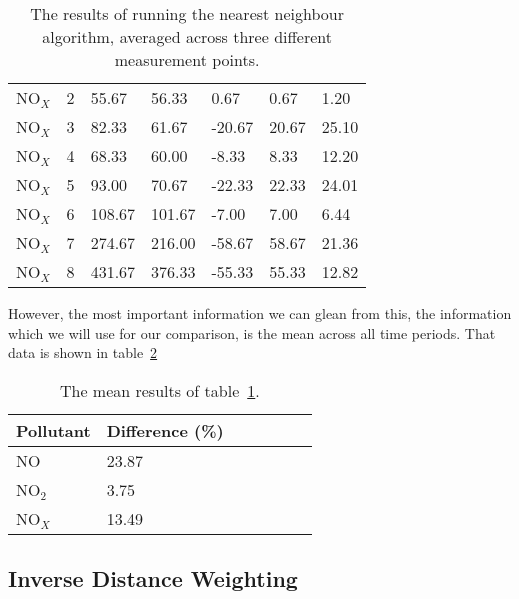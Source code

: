 \begin{table}[H]
\begin{tabular}{|l|l|l|l|l|l|l|}
				NO$_{X}$ & 2 & 55.67 & 56.33 & 0.67 & 0.67 & 1.20 \\
				NO$_{X}$ & 3 & 82.33 & 61.67 & -20.67 & 20.67 & 25.10 \\
				NO$_{X}$ & 4 & 68.33 & 60.00 & -8.33 & 8.33 & 12.20 \\
				NO$_{X}$ & 5 & 93.00 & 70.67 & -22.33 & 22.33 & 24.01 \\
				NO$_{X}$ & 6 & 108.67 & 101.67 & -7.00 & 7.00 & 6.44 \\
				NO$_{X}$ & 7 & 274.67 & 216.00 & -58.67 & 58.67 & 21.36 \\
				NO$_{X}$ & 8 & 431.67 & 376.33 & -55.33 & 55.33 & 12.82 \\ \hline
			\end{tabular}
			\caption{The results of running the nearest neighbour algorithm, averaged across three different measurement points.}
			\label{tab:nearest_neighbour_difference_results}
		\end{table}


		However, the most important information we can glean from this, the information which we will use for our comparison, is the mean across all time periods. That data is shown in table~\ref{tab:nearest_neighbour_difference_results_mean}

		\begin{table}[H]
			\centering
    		\begin{tabular}{|l|l|l|l|l|l|l|}
    			\hline
		        Pollutant & Difference (\%) \\ \hline
				NO & 23.87 \\
				NO$_{2}$ & 3.75 \\
				NO$_{X}$ & 13.49 \\ \hline
			\end{tabular}
			\caption{The mean results of table~\ref{tab:nearest_neighbour_difference_results}.}
			\label{tab:nearest_neighbour_difference_results_mean}
		\end{table}

        \subsection{Inverse Distance Weighting}\label{prediction_evaluation_results_inverse_distance_weighting}

